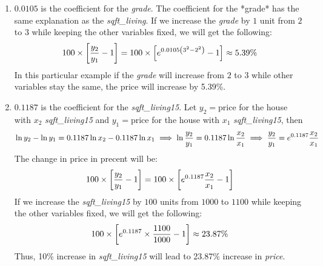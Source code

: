\documentclass[10pt]{article}
\begin{document}
\begin{enumerate}
\item $0.0105$ is the coefficient for the {\it grade}.  The coefficient for the *grade* has the same explanation as the {\it sqft\_living}. If we increase the {\it grade} by $1$ unit from $2$ to $3$ while keeping the other variables fixed, we will get the following:
$$
\large 
100 \times \left[\frac{y_2}{y_1} -1  \right] = 100 \times \left[ e^{0.0105\left( 3^{2} - 2^{2}\right)} - 1 \right]\approx 5.39\%
$$
In this particular example if the {\it grade} will increase from $2$ to $3$ while other variables stay the same, the price will increase by 5.39\%.
 \item $0.1187$ is the coefficient for the {\it sqft\_living15}. Let $y_2 = \text{price}$ for the house with $x_2$ {\it sqft\_living15} and $y_1 = \text{price}$ for the house with $x_1$ {\it sqft\_living15}, then 
$$
\large
\ln y_2 - \ln y_1 = 0.1187 \ln x_2 - 0.1187 \ln x_1 \implies \ln \frac{y_2}{y_1} = 0.1187 \ln \frac{x_2}{x_1} \implies \frac{y_2}{y_1} = e^{0.1187}\frac{x_2}{x_1}
$$
The change in price in precent will be:
$$
\large
100 \times \left[\frac{y_2}{y_1} - 1 \right]= 100 \times \left[ e^{0.1187}\frac{x_2}{x_1} - 1 \right]
$$
If we increase the {\it sqft\_living15} by $100$ units from $1000$ to $1100$ while keeping the other variables fixed, we will get the following:
$$
\large
100 \times \left[ e^{0.1187}\times \frac{1100}{1000} - 1 \right] \approx 23.87\%
$$
Thus, 10\% increase in {\it sqft\_living15} will lead to 23.87\% increase in {\it price}.
 \end{enumerate}
\end{document}
